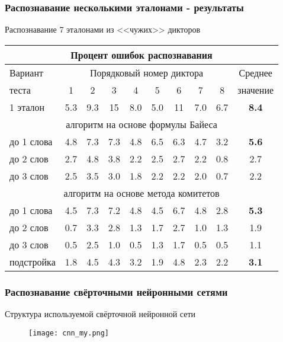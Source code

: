\begin{frame}
\frametitle{\normalsize Распознавание несколькими эталонами - результаты}
\small
\vfill
Распознавание 7 эталонами из <<чужих>> дикторов
\begin{table}[h]
	\centering
	{\small
		\begin{tabular}{| l | c | c | c | c | c | c | c | c | c |}
			\hline
			\multicolumn{10}{|c|}{\textbf{Процент ошибок распознавания}} \\
			\hline
			Вариант & \multicolumn{8}{c|}{Порядковый номер диктора} & Среднее \\
			\hhline{~--------}
			теста & 1 & 2 & 3 & 4 & 5 & 6 & 7 & 8 & значение \\
			\hline
			\hline
			1 эталон	& 5.3 & 9.3 & 15  & 8.0 & 5.0 & 11  & 7.0 & 6.7 & \textbf{8.4} \\
			\hline
			\multicolumn{10}{|c|}{алгоритм на основе формулы Байеса} \\
			\hline
			до 1 слова	& 4.8 & 7.3 & 7.3 & 4.8 & 6.5 & 6.3 & 4.7 & 3.2 & \textbf{5.6} \\
			до 2 слов	& 2.7 & 4.8 & 3.8 & 2.2 & 2.5 & 2.7 & 2.2 & 0.8 & 2.7 \\
			до 3 слов	& 2.5 & 3.5 & 3.0 & 1.8 & 2.2 & 2.2 & 2.0 & 0.7 & 2.2 \\
			\hline
			\multicolumn{10}{|c|}{алгоритм на основе метода комитетов} \\
			\hline
			до 1 слова	& 4.5 & 7.3 & 7.2 & 4.8 & 4.5 & 6.7 & 4.8 & 2.8 & \textbf{5.3} \\
			до 2 слов	& 0.7 & 3.3 & 2.8 & 1.3 & 1.7 & 2.7 & 1.0 & 1.3 & 1.9 \\
			до 3 слов	& 0.5 & 2.5 & 1.0 & 0.5 & 1.3 & 1.7 & 0.5 & 0.5 & 1.1 \\
			\hline
			подстройка	& 1.8 & 4.5 & 4.3 & 3.2 & 1.9 & 4.8 & 2.3 & 2.2 & \textbf{3.1} \\
			\hline
		\end{tabular}
	}
\end{table}
\vfill
\end{frame}


\begin{frame}
\frametitle{\normalsize Распознавание свёрточными нейронными сетями}
Структура используемой свёрточной нейронной сети
\begin{figure}[h]
	\centering
	\texttt{[image: cnn\_my.png]}
\end{figure}
\end{frame}

